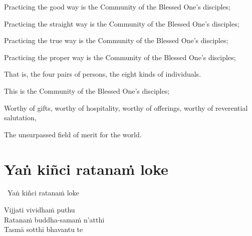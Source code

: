 \begin{english-verses}
  \begin{english-hang-firstline}
    Practicing the good way is the Community of the Blessed One's disciples;
  \end{english-hang-firstline}
  \begin{english-hangtogether-verses}
    Practicing the straight way is the Community of the Blessed One's disciples;
  \end{english-hangtogether-verses}
  \begin{english-hangtogether-verses}
    Practicing the true way is the Community of the Blessed One's disciples;
  \end{english-hangtogether-verses}
  \begin{english-hangtogether-verses}
    Practicing the proper way is the Community of the Blessed One's disciples;
  \end{english-hangtogether-verses}
  \begin{english-hangtogether-verses}
    That is, the four pairs of persons, the eight kinds of individuals.
  \end{english-hangtogether-verses}
  \begin{english-hangtogether-verses}
    This is the Community of the Blessed One's disciples;
  \end{english-hangtogether-verses}
  \begin{english-hangtogether-verses}
    Worthy of gifts, worthy of hospitality, worthy of offerings, worthy of reverential salutation,
  \end{english-hangtogether-verses}
  \begin{english-hangtogether-verses}
    The unsurpassed field of merit for the world.
  \end{english-hangtogether-verses}
\end{english-verses}

\suttaRef{[SN 11.3]}

\section{Yaṅ kiñci ratanaṁ loke}
\label{yan-kinci-ratanam'loke}

\begin{pali-leader}
  \anglebracketleft\ \hspace{-0.5mm}Yaṅ kiñci ratanaṁ loke \hspace{-0.5mm}\anglebracketright\
\end{pali-leader}
\begin{pali-hangtogether}
  Vijjati vividhaṁ puthu\\
  Ratanaṁ buddha-samaṁ n'atthi\\
  Tasmā sotthī bhavantu te
\end{pali-hangtogether}

